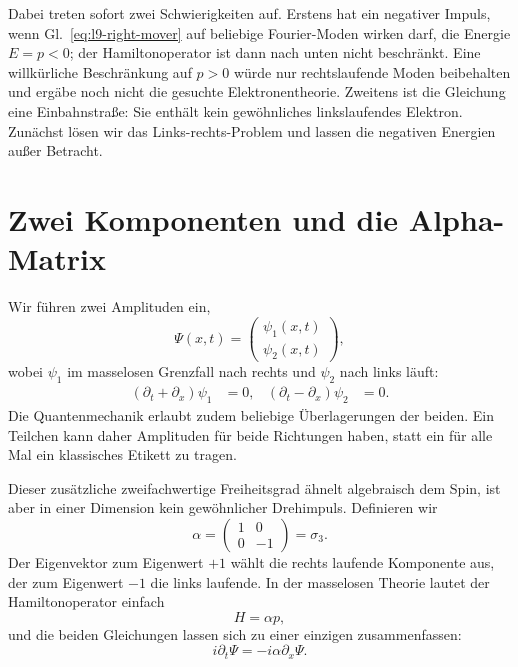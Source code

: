 Dabei treten sofort zwei Schwierigkeiten auf. Erstens hat ein negativer Impuls, wenn Gl.~\eqref{eq:l9-right-mover} auf beliebige Fourier-Moden wirken darf, die Energie \(E=p<0\); der Hamiltonoperator ist dann nach unten nicht beschränkt. Eine willkürliche Beschränkung auf \(p>0\) würde nur rechtslaufende Moden beibehalten und ergäbe noch nicht die gesuchte Elektronentheorie. Zweitens ist die Gleichung eine Einbahnstraße: Sie enthält kein gewöhnliches linkslaufendes Elektron. Zunächst lösen wir das Links-rechts-Problem und lassen die negativen Energien außer Betracht.

\section{Zwei Komponenten und die Alpha-Matrix}

Wir führen zwei Amplituden ein,
\begin{equation}
\Psi(x,t)=
\begin{pmatrix}
\psi_1(x,t)\\[3pt]
\psi_2(x,t)
\end{pmatrix},
\end{equation}
wobei \(\psi_1\) im masselosen Grenzfall nach rechts und \(\psi_2\) nach links läuft:
\begin{align}
(\partial_t+\partial_x)\psi_1&=0,
&
(\partial_t-\partial_x)\psi_2&=0.
\end{align}
Die Quantenmechanik erlaubt zudem beliebige Überlagerungen der beiden. Ein Teilchen kann daher Amplituden für beide Richtungen haben, statt ein für alle Mal ein klassisches Etikett zu tragen.

Dieser zusätzliche zweifachwertige Freiheitsgrad ähnelt algebraisch dem Spin, ist aber in einer Dimension kein gewöhnlicher Drehimpuls. Definieren wir
\begin{equation}
\alpha=
\begin{pmatrix}
1&0\\
0&-1
\end{pmatrix}
=\sigma_3.
\label{eq:l9-alpha}
\end{equation}
Der Eigenvektor zum Eigenwert \(+1\) wählt die rechts laufende Komponente aus, der zum Eigenwert \(-1\) die links laufende. In der masselosen Theorie lautet der Hamiltonoperator einfach
\begin{equation}
H=\alpha p,
\end{equation}
und die beiden Gleichungen lassen sich zu einer einzigen zusammenfassen:
\begin{equation}
i\partial_t\Psi=-i\alpha\partial_x\Psi.
\label{eq:l9-massless-dirac}
\end{equation}

